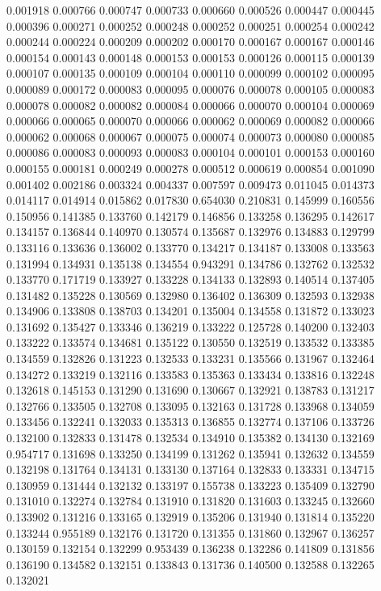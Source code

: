 0.001918
0.000766
0.000747
0.000733
0.000660
0.000526
0.000447
0.000445
0.000396
0.000271
0.000252
0.000248
0.000252
0.000251
0.000254
0.000242
0.000244
0.000224
0.000209
0.000202
0.000170
0.000167
0.000167
0.000146
0.000154
0.000143
0.000148
0.000153
0.000153
0.000126
0.000115
0.000139
0.000107
0.000135
0.000109
0.000104
0.000110
0.000099
0.000102
0.000095
0.000089
0.000172
0.000083
0.000095
0.000076
0.000078
0.000105
0.000083
0.000078
0.000082
0.000082
0.000084
0.000066
0.000070
0.000104
0.000069
0.000066
0.000065
0.000070
0.000066
0.000062
0.000069
0.000082
0.000066
0.000062
0.000068
0.000067
0.000075
0.000074
0.000073
0.000080
0.000085
0.000086
0.000083
0.000093
0.000083
0.000104
0.000101
0.000153
0.000160
0.000155
0.000181
0.000249
0.000278
0.000512
0.000619
0.000854
0.001090
0.001402
0.002186
0.003324
0.004337
0.007597
0.009473
0.011045
0.014373
0.014117
0.014914
0.015862
0.017830
0.654030
0.210831
0.145999
0.160556
0.150956
0.141385
0.133760
0.142179
0.146856
0.133258
0.136295
0.142617
0.134157
0.136844
0.140970
0.130574
0.135687
0.132976
0.134883
0.129799
0.133116
0.133636
0.136002
0.133770
0.134217
0.134187
0.133008
0.133563
0.131994
0.134931
0.135138
0.134554
0.943291
0.134786
0.132762
0.132532
0.133770
0.171719
0.133927
0.133228
0.134133
0.132893
0.140514
0.137405
0.131482
0.135228
0.130569
0.132980
0.136402
0.136309
0.132593
0.132938
0.134906
0.133808
0.138703
0.134201
0.135004
0.134558
0.131872
0.133023
0.131692
0.135427
0.133346
0.136219
0.133222
0.125728
0.140200
0.132403
0.133222
0.133574
0.134681
0.135122
0.130550
0.132519
0.133532
0.133385
0.134559
0.132826
0.131223
0.132533
0.133231
0.135566
0.131967
0.132464
0.134272
0.133219
0.132116
0.133583
0.135363
0.133434
0.133816
0.132248
0.132618
0.145153
0.131290
0.131690
0.130667
0.132921
0.138783
0.131217
0.132766
0.133505
0.132708
0.133095
0.132163
0.131728
0.133968
0.134059
0.133456
0.132241
0.132033
0.135313
0.136855
0.132774
0.137106
0.133726
0.132100
0.132833
0.131478
0.132534
0.134910
0.135382
0.134130
0.132169
0.954717
0.131698
0.133250
0.134199
0.131262
0.135941
0.132632
0.134559
0.132198
0.131764
0.134131
0.133130
0.137164
0.132833
0.133331
0.134715
0.130959
0.131444
0.132132
0.133197
0.155738
0.133223
0.135409
0.132790
0.131010
0.132274
0.132784
0.131910
0.131820
0.131603
0.133245
0.132660
0.133902
0.131216
0.133165
0.132919
0.135206
0.131940
0.131814
0.135220
0.133244
0.955189
0.132176
0.131720
0.131355
0.131860
0.132967
0.136257
0.130159
0.132154
0.132299
0.953439
0.136238
0.132286
0.141809
0.131856
0.136190
0.134582
0.132151
0.133843
0.131736
0.140500
0.132588
0.132265
0.132021
